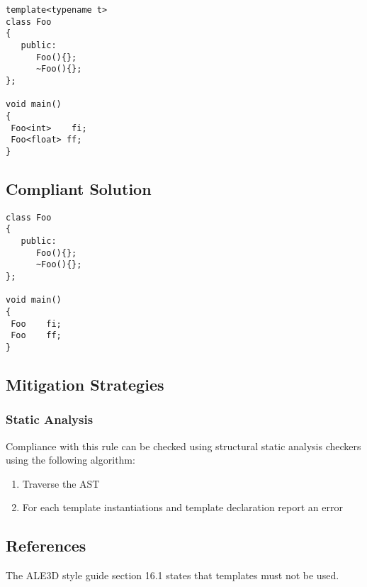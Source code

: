 \begin{verbatim}
template<typename t>
class Foo
{
   public:
      Foo(){};
      ~Foo(){};
};

void main()
{
 Foo<int>    fi;
 Foo<float> ff;
}
\end{verbatim}

\subsection{Compliant Solution}


\begin{verbatim}
class Foo
{
   public:
      Foo(){};
      ~Foo(){};
};

void main()
{
 Foo    fi;
 Foo    ff;
}
\end{verbatim}

\subsection{Mitigation Strategies}
\subsubsection{Static Analysis} 

Compliance with this rule can be checked using structural static analysis checkers using the following algorithm:

\begin{enumerate}
\item Traverse the AST
\item For each template instantiations and template declaration report an error
\end{enumerate}

\subsection{References}

The ALE3D style guide section 16.1 states that templates
must not be used.

